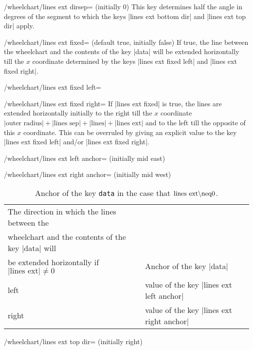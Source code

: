 \documentclass[a4paper,english,dvipsnames]{ltxdoc}
\begin{document}
\begin{key}{/wheelchart/lines ext dirsep= (initially 0)}
This key determines half the angle in degrees of the segment to which the keys |lines ext bottom dir| and |lines ext top dir| apply.
\end{key}
\begin{key}{/wheelchart/lines ext fixed= (default true, initially false)}
If true, the line between the wheelchart and the contents of the key |data| will be extended horizontally till the $x$ coordinate determined by the keys |lines ext fixed left| and |lines ext fixed right|.
\end{key}
\begin{key}{/wheelchart/lines ext fixed left=}
\end{key}
\begin{key}{/wheelchart/lines ext fixed right=}
If |lines ext fixed| is true, the lines are extended horizontally initially to the right till the $x$ coordinate $\text{|outer radius|}+\text{|lines sep|}+\text{|lines|}+\text{|lines ext|}$ and to the left till the opposite of this $x$ coordinate. This can be overruled by giving an explicit value to the key |lines ext fixed left| and/or |lines ext fixed right|.
\end{key}
\begin{key}{/wheelchart/lines ext left anchor= (initially mid east)}
\end{key}
\begin{key}{/wheelchart/lines ext right anchor= (initially mid west)}
\begin{table}[ht]
\centering
\begin{tabular}{ll}
The direction in which the lines between the & \\
wheelchart and the contents of the key |data| will & \\
be extended horizontally if $\text{|lines ext|}\neq 0$ & Anchor of the key |data|\\\hline
left & value of the key |lines ext left anchor|\\
right & value of the key |lines ext right anchor|\\
\end{tabular}
\caption{Anchor of the key \texttt{data} in the case that $\text{\ttfamily lines ext}\neq 0$.}\label{tableanchorofthekeydatainthecasethatlinesextdifferentfromzero}
\end{table}
\end{key}
\begin{key}{/wheelchart/lines ext top dir= (initially right)}
\end{key}
\end{document}
